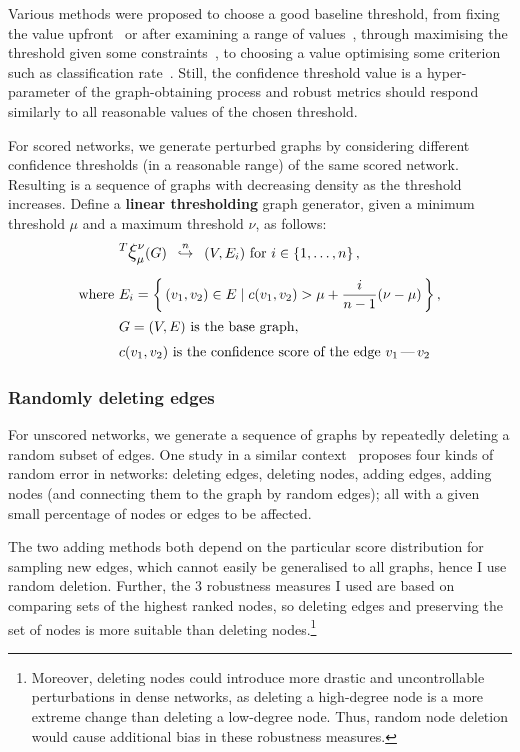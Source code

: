 Various methods were proposed to choose a good baseline threshold, from fixing the value upfront~\cite{MeunierAgerelatedChangesModular2009} or after examining a range of values~\cite{vanWijkComparingBrainNetworks2010,HorstmannStateDependentProperties2010}, through maximising the threshold given some constraints~\cite{BassettAdaptiveReconfigurationFractal2006}, to choosing a value optimising some criterion such as classification rate~\cite{ZaninOptimizingFunctionalNetwork2012}.
Still, the confidence threshold value is a hyper-parameter of the graph-obtaining process and robust metrics should respond similarly to all reasonable values of the chosen threshold.

For scored networks, we generate perturbed graphs by considering different confidence thresholds (in a reasonable range) of the same scored network.
Resulting is a sequence of graphs with decreasing density as the threshold increases.
Define a \textbf{linear thresholding} graph generator, given a minimum threshold $\mu$ and a maximum threshold $\nu$, as follows:
\begin{align}
    &\mathlarger{^T \mathlarger{\xi}}_{\mu}^{\nu}(G) \generates{n} (V, E_i)~\text{for}~i\in \integersto{n}, \\[6pt]
    \text{where}~& E_i = \Set{(v_1, v_2)\in E}{ c(v_1, v_2) > \mu + \frac{i}{n - 1}(\nu - \mu) }, \nonumber \\
    &G = (V, E)~\text{is the base graph}, \nonumber \\
    &c(v_1, v_2)~\text{is the confidence score of the edge $v_1\,\text{---}\,v_2$} \nonumber
\end{align}



\subsubsection*{Randomly deleting edges}\label{sec:randomly_removing_edges}

For unscored networks, we generate a sequence of graphs by repeatedly deleting a random subset of edges.
One study in a similar context~\cite{BorgattiRobustnessCentralityMeasures2006} proposes four kinds of random error in networks: deleting edges, deleting nodes, adding edges, adding nodes (and connecting them to the graph by random edges); all with a given small percentage of nodes or edges to be affected.

The two adding methods both depend on the particular score distribution for sampling new edges, which cannot easily be generalised to all graphs, hence I use random deletion.
Further, the 3 robustness measures I used are based on comparing sets of the highest ranked nodes, so deleting edges and preserving the set of nodes is more suitable than deleting nodes.\footnote{Moreover, deleting nodes could introduce more drastic and uncontrollable perturbations in dense networks, as deleting a high-degree node is a more extreme change than deleting a low-degree node. Thus, random node deletion would cause additional bias in these robustness measures.}


